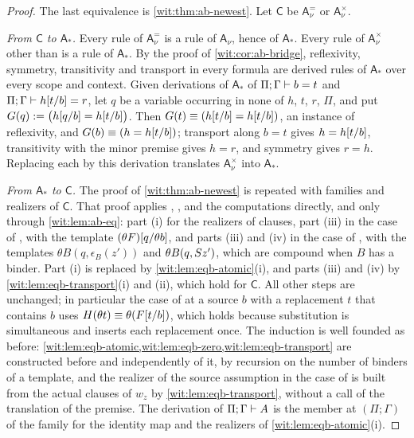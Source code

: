 \begin{proof}
The last equivalence is \cref{wit:thm:ab-newest}.  Let $\mathsf{C}$ be
$\mathsf{A}^{=}_{\nu}$ or $\mathsf{A}^{\times}_{\nu}$.

\emph{From $\mathsf{C}$ to $\mathsf{A}_{\ast}$.}  Every rule of
$\mathsf{A}^{=}_{\nu}$ is a rule of $\mathsf{A}_{\nu}$, hence of
$\mathsf{A}_{\ast}$.  Every rule of $\mathsf{A}^{\times}_{\nu}$ other than
 is a rule of $\mathsf{A}_{\ast}$.  By the proof of
\cref{wit:cor:ab-bridge}, reflexivity, symmetry, transitivity and transport in
every formula are derived rules of $\mathsf{A}_{\ast}$ over every scope and
context.  Given derivations of $\mathsf{A}_{\ast}$ of $\Pi;\Gamma\vdash b=t$
and $\Pi;\Gamma\vdash h[t/b]=r$, let $q$ be a variable occurring in
none of $h$, $t$, $r$, $\Pi$, and put
$G(q)\mathrel{:=}\bigl(h[q/b]=h[t/b]\bigr)$.  Then
$G(t)\equiv(h[t/b]=h[t/b])$, an instance of reflexivity, and
$G(b)\equiv(h=h[t/b])$; transport along $b=t$ gives
$h=h[t/b]$, transitivity with the minor premise gives $h=r$, and
symmetry gives $r=h$.  Replacing each  by this derivation
translates $\mathsf{A}^{\times}_{\nu}$ into $\mathsf{A}_{\ast}$.

\emph{From $\mathsf{A}_{\ast}$ to $\mathsf{C}$.}  The proof of
\cref{wit:thm:ab-newest} is repeated with families and realizers of
$\mathsf{C}$.  That proof applies , ,
 and the computations directly, and  only
through \cref{wit:lem:ab-eq}: part (i) for the realizers of clauses, part
(iii) in the case of , with the template
$(\theta F)[q/\theta b]$, and parts (iii) and (iv) in the case of
, with the templates $\theta B(q,\epsilon_B(z'))$ and
$\theta B(q,S z')$, which are compound when $B$ has a binder.  Part (i)
is replaced by \cref{wit:lem:eqb-atomic}(i), and parts (iii) and (iv) by
\cref{wit:lem:eqb-transport}(i) and (ii), which hold for $\mathsf{C}$.  All
other steps are unchanged; in particular the case of  at a
source $b$ with a replacement $t$ that contains $b$ uses
$H(\theta t)\equiv\theta(F[t/b])$, which holds because substitution
is simultaneous and inserts each replacement once.  The induction is well
founded as before: \cref{wit:lem:eqb-atomic,wit:lem:eqb-zero,wit:lem:eqb-transport}
are constructed before and independently of it, by recursion on the number
of binders of a template, and the realizer of the source assumption in the
case of  is built from the actual clauses of $w_z$ by
\cref{wit:lem:eqb-transport}, without a call of the translation of the
premise.  The derivation of $\Pi;\Gamma\vdash A$ is the member at
$(\Pi;\Gamma)$ of the family for the identity map and the realizers of
\cref{wit:lem:eqb-atomic}(i).
\end{proof}


